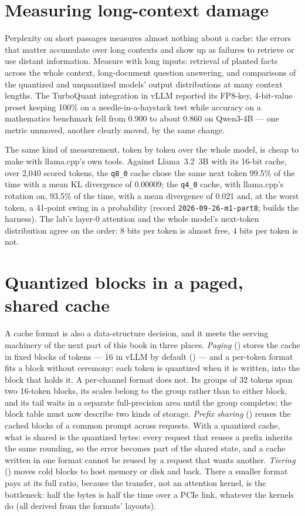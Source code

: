 \section{Measuring long-context damage}

Perplexity on short passages measures almost nothing about a cache: the
errors that matter accumulate over long contexts and show up as failures to
retrieve or use distant information. Measure with long inputs: retrieval of
planted facts across the whole context, long-document question answering, and
comparisons of the quantized and unquantized models' output distributions at
many context lengths. The TurboQuant integration in vLLM reported its FP8-key,
4-bit-value preset keeping 100\% on a needle-in-a-haystack test while
accuracy on a mathematics benchmark fell from 0.900 to about 0.860 on
Qwen3-4B \cite{vllm2026turboquantpr} --- one metric unmoved, another clearly
moved, by the same change.

The same kind of measurement, token by token over the whole model, is cheap to
make with llama.cpp's own tools. Against Llama~3.2~3B with its 16-bit cache, over
2,040 scored tokens, the \texttt{q8\_0} cache chose the same next token 99.5\%
of the time with a mean KL divergence of 0.00009; the \texttt{q4\_0} cache, with
llama.cpp's rotation on, 93.5\% of the time, with a mean divergence of 0.021 and,
at the worst token, a 41-point swing in a probability (record
\texttt{2026-09-26-m1-part8};  builds the harness).
The lab's layer-0 attention and the whole model's next-token distribution agree
on the order: 8 bits per token is almost free, 4 bits per token is not.

\section{Quantized blocks in a paged, shared cache}

A cache format is also a data-structure decision, and it meets the serving
machinery of the next part of this book in three places. \emph{Paging}
() stores the cache in fixed blocks of tokens --- 16 in vLLM by
default () --- and a per-token format fits a block
without ceremony: each token is quantized when it is written, into the block
that holds it. A per-channel format does not. Its groups of 32 tokens span two
16-token blocks, its scales belong to the group rather than to either block, and
its tail waits in a separate full-precision area until the group completes; the
block table must now describe two kinds of storage. \emph{Prefix sharing}
() reuses the cached blocks of a common prompt across
requests. With a quantized cache, what is shared is the quantized bytes: every
request that reuses a prefix inherits the same rounding, so the error becomes
part of the shared state, and a cache written in one format cannot be reused by
a request that wants another. \emph{Tiering} () moves
cold blocks to host memory or disk and back. There a smaller format pays at its
full ratio, because the transfer, not an attention kernel, is the bottleneck:
half the bytes is half the time over a PCIe link, whatever the kernels do (all
derived from the formats' layouts).

